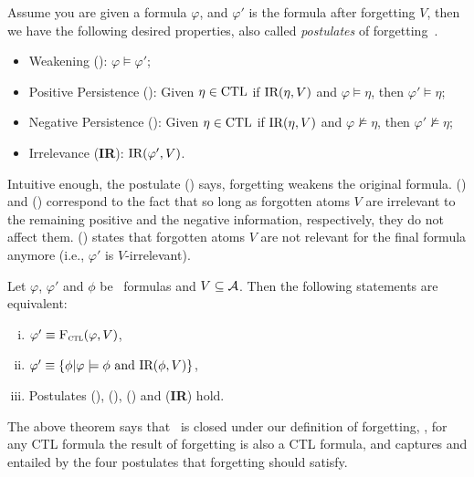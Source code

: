 \documentclass{article}
\begin{document}
Assume you are given a formula $\varphi$, and $\varphi'$ is the formula after forgetting $V$, then we have the following desired properties, also called {\em postulates} of forgetting~\cite{Yan:AIJ:2009}.
\begin{itemize}
  \item Weakening (\W): $\varphi \models \varphi'$;
  \item Positive Persistence (\PP):
  Given $\eta \in \textrm{CTL}$ if $\textrm{IR}(\eta, V)$ and $\varphi \models \eta$, then $\varphi' \models \eta$;
  \item Negative Persistence (\NgP):   Given $\eta \in \textrm{CTL}$  if $\textrm{IR}(\eta, V)$ and $\varphi \nvDash \eta$, then $\varphi' \nvDash \eta$;
  \item Irrelevance (\textbf{IR}): $\textrm{IR}(\varphi', V)$.
\end{itemize}


Intuitive enough, the postulate (\W) says, forgetting weakens the original formula.  (\PP)  and  (\NgP) correspond to the fact that so long as forgotten atoms $V$ are irrelevant to the remaining positive and the negative information, respectively, they do not affect them. (\textbf{\IR}) states that forgotten atoms $V$ are not relevant for the final formula anymore (i.e., $\varphi'$ is $V$-irrelevant).



\begin{theorem}\label{thm:close}
Let $\varphi$, $\varphi'$ and $\phi$ be \CTL\ formulas and $V \subseteq {\cal A}$.
Then the following statements are equivalent:
\begin{enumerate}[(i)]
  \item $\varphi' \equiv {\textsc{F}_{\textsc{ctl}}}(\varphi, V)$,
  \item $\varphi'\equiv \{\phi | \varphi \models \phi \text{ and } \textrm{IR}(\phi, V)\}$,
  \item Postulates (\W), (\PP), (\NgP) and (\textbf{IR}) hold.
\end{enumerate}
\end{theorem}
The above theorem says that \CTL\ is closed under our definition of forgetting, \ie, for any CTL formula the result of forgetting is also a CTL formula,  and captures and entailed by the four postulates that forgetting should satisfy.
\end{document}
